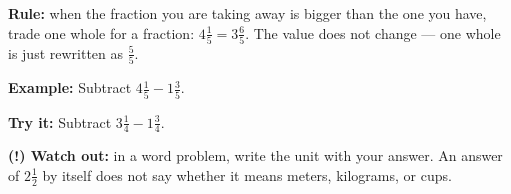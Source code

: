 \documentclass[12pt]{article}
\begin{document}
\begin{formulabox}
\textbf{Rule:} when the fraction you are taking away is bigger than the one
you have, trade one whole for a fraction:
$4\tfrac{1}{5} = 3\tfrac{6}{5}$. The value does not change --- one whole is
just rewritten as $\tfrac{5}{5}$.
\end{formulabox}

\begin{examplebox}
\textbf{Example:} \quad Subtract $4\tfrac{1}{5} - 1\tfrac{3}{5}$.
\end{examplebox}

\begin{tryitbox}
\textbf{Try it:} \quad Subtract $3\tfrac{1}{4} - 1\tfrac{3}{4}$.\\[2pt]
\end{tryitbox}

\begin{watchoutbox}
\textbf{(!) Watch out:} in a word problem, write the unit with your answer.
An answer of $2\tfrac{1}{2}$ by itself does not say whether it means meters,
kilograms, or cups.
\end{watchoutbox}
\end{document}
